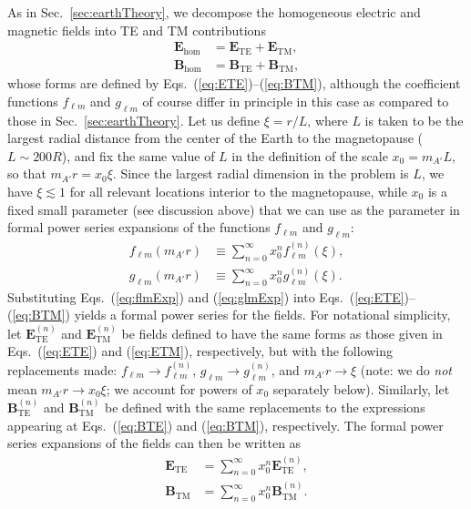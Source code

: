 \documentclass[amsmath,amssymb,aps,10pt,prd,letterpaper,nofootinbib,balancelastpage,notitlepage,superscriptaddress,twocolumn,floatfix]{revtex4-2}
\newcommand{\secref}[2][]{Sec{#1}.~\ref{#2}}		%
\renewcommand{\eqref}[2][]{Eq{#1}.~(\ref{eq:#2})}	%
\newcommand{\eqrefRange}[2]{Eqs.~(\ref{eq:#1})--(\ref{eq:#2})}
\begin{document}
As in \secref{sec:earthTheory}, we decompose the homogeneous electric and magnetic fields into TE and TM contributions
\begin{align}
    \bm{E}_\text{hom}&=\bm{E}_\text{TE} + \bm{E}_\text{TM},\\
    \bm{B}_\text{hom}&=\bm{B}_\text{TE} + \bm{B}_\text{TM},
\end{align}
whose forms are defined by \eqrefRange{ETE}{BTM}, although the coefficient functions $f_{\ell m}$ and $g_{\ell m}$ of course differ in principle in this case as compared to those in \secref{sec:earthTheory}.
Let us define $\xi=r/L$, where $L$ is taken to be the largest radial distance from the center of the Earth to the magnetopause ($L\sim 200 R$), and fix the same value of $L$ in the definition of the scale $x_0 = m_{A'}L$, so that $m_{A'}r=x_0\xi$.
Since the largest radial dimension in the problem is $L$, we have $\xi\lesssim 1$ for all relevant locations interior to the magnetopause, while $x_0$ is a fixed small parameter (see discussion above) that we can use as the parameter in formal power series expansions of the functions $f_{\ell m}$ and $g_{\ell m}$: 
\begin{align}
    f_{\ell m}(m_{A'} r)&\equiv \sum_{n=0}^{\infty} x_0^nf_{\ell m}^{(n)}(\xi), \label{eq:flmExp}\\
    g_{\ell m}(m_{A'} r)&\equiv \sum_{n=0}^{\infty} x_0^ng_{\ell m}^{(n)}(\xi).\label{eq:glmExp}
\end{align}
Substituting \eqref[s]{flmExp} and (\ref{eq:glmExp}) into \eqrefRange{ETE}{BTM} yields a formal power series for the fields. 
For notational simplicity, let $\bm E_\text{TE}^{(n)}$ and $\bm E_\text{TM}^{(n)}$ be fields defined to have the same forms as those given in \eqref[s]{ETE} and (\ref{eq:ETM}), respectively, but with the following replacements made: $f_{\ell m}\rightarrow f_{\ell m}^{(n)}$, $g_{\ell m} \rightarrow g_{\ell m}^{(n)}$, and $m_{A'}r \rightarrow \xi$ (note: we do \emph{not} mean $m_{A'}r\rightarrow x_0\xi$; we account for powers of $x_0$ separately below).
Similarly, let $\bm B_\text{TE}^{(n)}$ and $\bm B_\text{TM}^{(n)}$ be defined with the same replacements to the expressions appearing at \eqref[s]{BTE} and (\ref{eq:BTM}), respectively.
The formal power series expansions of the fields can then be written as 
\begin{align}
    \bm E_\text{TE}&=\sum_{n=0}^{\infty} x_0^n \bm E_\text{TE}^{(n)},\\
    \bm B_\text{TM}&=\sum_{n=0}^{\infty} x_0^n \bm B_\text{TM}^{(n)}.
\end{align}
\end{document}
